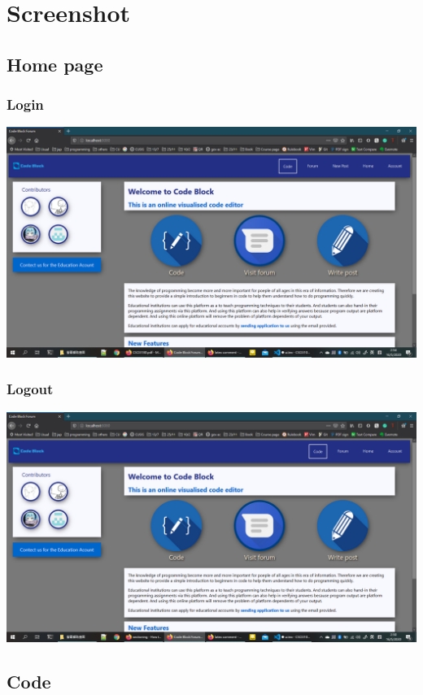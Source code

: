 \section{Screenshot}
\subsection{Home page}
\subsubsection{Login}
\includegraphics[scale=0.45]{Doc/Pics/home_login.png}
\subsubsection{Logout}
\includegraphics[scale=0.45]{Doc/Pics/home_logout.png}

\subsection{Code}

